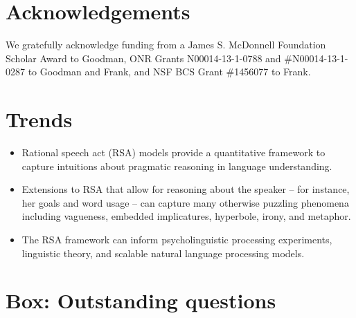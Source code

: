 \documentclass[]{elsarticle}
\begin{document}
\section{Acknowledgements}

We gratefully acknowledge funding from a James S. McDonnell Foundation Scholar Award to Goodman,
 ONR Grants N00014-13-1-0788 and \#N00014-13-1-0287 to Goodman and Frank, and NSF BCS Grant \#1456077 to Frank.




\newpage

\appendix




\section{Trends}\label{trends-box}

\begin{itemize}
\item Rational speech act (RSA) models provide a quantitative framework to
  capture intuitions about pragmatic reasoning in language
  understanding.
\item Extensions to RSA that allow for reasoning about the speaker -- for instance, her goals and word usage -- can capture many otherwise puzzling phenomena
  including vagueness, embedded implicatures, hyperbole, irony, and
  metaphor.
\item The RSA framework can inform psycholinguistic processing experiments,
  linguistic theory, and scalable natural language processing models.
\end{itemize}

\section{Box: Outstanding questions}\label{box-outstanding-questions}
\end{document}
